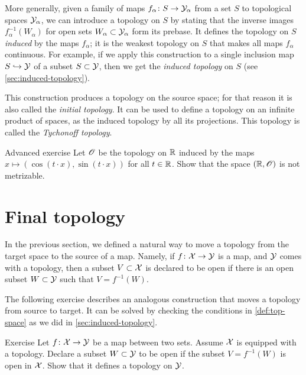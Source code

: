 More generally, given a family of maps $f_\alpha\colon S\to \mathcal{Y}_\alpha$ from a set $S$ to topological spaces $\mathcal{Y}_\alpha$, we can introduce a topology on $S$ by stating that the inverse images $f^{-1}_\alpha(W_\alpha)$ for open sets $W_\alpha\subset\mathcal{Y}_\alpha$ form its prebase.
It defines the topology on $S$ \emph{induced} by the maps $f_\alpha$;
it is the weakest topology on $S$ that makes all maps $f_\alpha$ continuous.
For example, if we apply this construction to a single inclusion map $S\hookrightarrow \mathcal{Y}$ of a subset $S\subset \mathcal{Y}$, then we get the {}\emph{induced topology} on $S$ (see \ref{sec:induced-topology}).

This construction produces a topology on the source space;
for that reason it is also called the \emph{initial topology}.
It can be used to define a topology on an infinite product of spaces, as the induced topology by all its projections.
This topology is called the \emph{Tychonoff topology}.

\begin{thm}{Advanced exercise}\label{ex:induced-nonmetrizable}
Let $\mathscr{O}$ be the topology on $\mathbb{R}$ induced by the maps $x\mapsto (\cos(t\cdot x),\sin(t\cdot x))$ for all $t\in \mathbb{R}$.
Show that the space $(\mathbb{R},\mathscr{O})$ is not metrizable.
\end{thm}

\section{Final topology}\label{sec:final-topology}

In the previous section, we defined a natural way to move a topology from the target space to the source of a map.
Namely, if $f\:\c{X}\z\to\c{Y}$ is a map, and $\mathcal{Y}$ comes with a topology, then a subset $V\subset\mathcal{X}$ is declared to be open if there is an open subset $W\subset\mathcal{Y}$ such that $V=f^{-1}(W)$.

The following exercise describes an analogous construction that moves a topology from source to target.
It can be solved by checking the conditions in \ref{def:top-space} as we did in \ref{sec:induced-topology}.

\begin{thm}{Exercise}\label{ex:move-topology:pushforward}
Let $f\colon\mathcal{X}\to\mathcal{Y}$ be a map between two sets.
Assume $\mathcal{X}$ is equipped with a topology.
Declare a subset $W\subset\mathcal{Y}$ to be open if the subset $V=f^{-1}(W)$ is open in $\mathcal{X}$.
Show that it defines a topology on $\mathcal{Y}$.

\end{thm}

